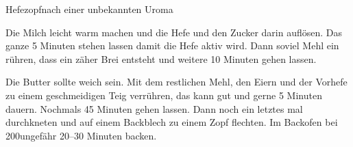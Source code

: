 \begin{recipe}{Hefezopf}{nach einer unbekannten Uroma}\label{Hefezopf}
  \inglist

  \steps
  Die Milch leicht warm machen und die Hefe und den Zucker darin auflösen. Das
  ganze 5 Minuten stehen lassen damit die Hefe aktiv wird. Dann soviel Mehl
  ein rühren, dass ein zäher Brei entsteht und weitere 10 Minuten gehen lassen.

  Die Butter sollte weich sein. Mit dem restlichen Mehl, den Eiern und der
  Vorhefe zu einem geschmeidigen Teig verrühren, das kann gut und gerne 5
  Minuten dauern. Nochmals 45 Minuten gehen lassen. Dann noch ein letztes mal
  durchkneten und auf einem Backblech zu einem Zopf flechten. Im Backofen bei
  200\celsius ungefähr 20--30 Minuten backen.

\end{recipe}
